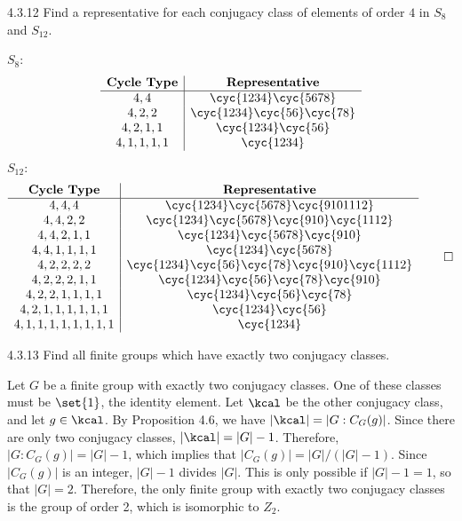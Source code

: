\begin{exercise}{4.3.12}
	Find a representative for each conjugacy class of elements of order $4$ in $S_8$ and $S_{12}$.
\end{exercise}

\begin{sol}
	$S_8$:
	\[
		\begin{array}{c|c}
			\textbf{Cycle Type} & \textbf{Representative} \\
			\hline
			4, 4 & \cyc{1 2 3 4}\cyc{5 6 7 8} \\
			4, 2, 2 & \cyc{1 2 3 4}\cyc{5 6}\cyc{7 8} \\
			4, 2, 1, 1 & \cyc{1 2 3 4}\cyc{5 6} \\
			4, 1, 1, 1, 1 & \cyc{1 2 3 4}
		\end{array}
	\]
	$S_{12}$:
	\[
		\begin{array}{c|c}
			\textbf{Cycle Type} & \textbf{Representative} \\
			\hline
			4, 4, 4 & \cyc{1 2 3 4}\cyc{5 6 7 8}\cyc{9 10 11 12} \\
			4, 4, 2, 2 & \cyc{1 2 3 4}\cyc{5 6 7 8}\cyc{9 10}\cyc{11 12} \\
			4, 4, 2, 1, 1 & \cyc{1 2 3 4}\cyc{5 6 7 8}\cyc{9 10} \\
			4, 4, 1, 1, 1, 1 & \cyc{1 2 3 4}\cyc{5 6 7 8} \\
			4, 2, 2, 2, 2 & \cyc{1 2 3 4}\cyc{5 6}\cyc{7 8}\cyc{9 10}\cyc{11 12} \\
			4, 2, 2, 2, 1, 1 & \cyc{1 2 3 4}\cyc{5 6}\cyc{7 8}\cyc{9 10} \\
			4, 2, 2, 1, 1, 1, 1 & \cyc{1 2 3 4}\cyc{5 6}\cyc{7 8} \\
			4, 2, 1, 1, 1, 1, 1, 1 & \cyc{1 2 3 4}\cyc{5 6} \\
			4, 1, 1, 1, 1, 1, 1, 1, 1 & \cyc{1 2 3 4}
		\end{array} \qedhere
	\]
\end{sol}

\begin{spex}{4.3.13}
	Find all finite groups which have exactly two conjugacy classes.
\end{spex}

\begin{sol}[spsol]
	Let $G$ be a finite group with exactly two conjugacy classes.
	One of these classes must be $\set{1}$, the identity element.
	Let $\kcal$ be the other conjugacy class, and let $g \in \kcal$.
	By Proposition 4.6, we have $|\kcal| = |G : C_G(g)|$.
	Since there are only two conjugacy classes, $|\kcal| = |G| - 1$.
	Therefore, $|G : C_G(g)| = |G| - 1$, which implies that $|C_G(g)| = |G|/(|G| - 1)$.
	Since $|C_G(g)|$ is an integer, $|G| - 1$ divides $|G|$.
	This is only possible if $|G| - 1 = 1$, so that $|G| = 2$.
	Therefore, the only finite group with exactly two conjugacy classes is the group of order 2, which is isomorphic to $Z_2$.
\end{sol}

